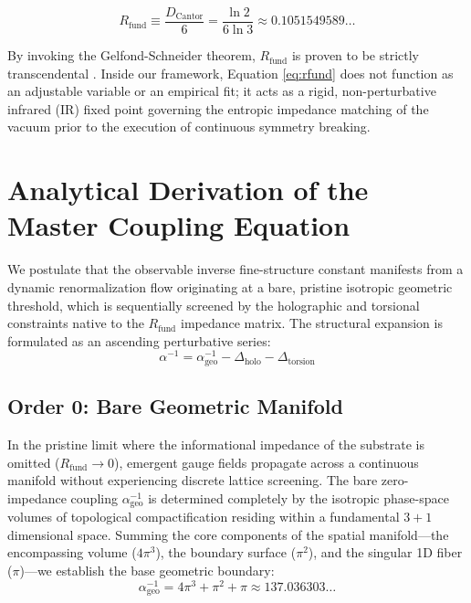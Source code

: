 \documentclass[12pt,a4paper]{article}
\begin{document}
\begin{equation}
R_{\text{fund}} \equiv \frac{D_{\text{Cantor}}}{6} = \frac{\ln 2}{6 \ln 3} \approx 0.1051549589\dots
\label{eq:rfund}
\end{equation}

By invoking the Gelfond-Schneider theorem, $R_{\text{fund}}$ is proven to be strictly transcendental \cite{peinador2026_foundational}. Inside our framework, Equation \eqref{eq:rfund} does not function as an adjustable variable or an empirical fit; it acts as a rigid, non-perturbative infrared (IR) fixed point governing the entropic impedance matching of the vacuum prior to the execution of continuous symmetry breaking.


\section{Analytical Derivation of the Master Coupling Equation}

We postulate that the observable inverse fine-structure constant manifests from a dynamic renormalization flow originating at a bare, pristine isotropic geometric threshold, which is sequentially screened by the holographic and torsional constraints native to the $R_{\text{fund}}$ impedance matrix. The structural expansion is formulated as an ascending perturbative series:
\begin{equation}
\alpha^{-1} = \alpha^{-1}_{\text{geo}} - \Delta_{\text{holo}} - \Delta_{\text{torsion}}
\end{equation}

\subsection{Order 0: Bare Geometric Manifold}

In the pristine limit where the informational impedance of the substrate is omitted ($R_{\text{fund}} \to 0$), emergent gauge fields propagate across a continuous manifold without experiencing discrete lattice screening. The bare zero-impedance coupling $\alpha^{-1}_{\text{geo}}$ is determined completely by the isotropic phase-space volumes of topological compactification residing within a fundamental $3+1$ dimensional space. Summing the core components of the spatial manifold—the encompassing volume ($4\pi^3$), the boundary surface ($\pi^2$), and the singular 1D fiber ($\pi$)—we establish the base geometric boundary:
\begin{equation}
\alpha^{-1}_{\text{geo}} = 4\pi^3 + \pi^2 + \pi \approx 137.036303\dots
\end{equation}
\end{document}
